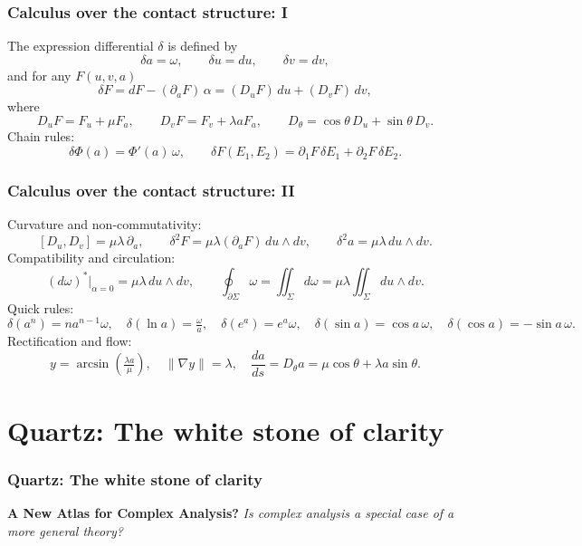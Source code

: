 \documentclass[aspectratio=169]{beamer}
\begin{document}
\begin{frame}
    \frametitle{Calculus over the contact structure: I}
    The expression differential $\delta$ is defined by
    \[
      \delta a=\omega,\qquad \delta u=du,\qquad \delta v=dv,
    \]
    and for any $F(u,v,a)$
    \[
      \delta F = dF - (\partial_a F)\,\alpha
      = (D_uF)\,du + (D_vF)\,dv,
    \]
    where
    \[
      D_uF=F_u+\mu F_a,\qquad D_vF=F_v+\lambda a F_a,\qquad
      D_\theta=\cos\theta\,D_u+\sin\theta\,D_v.
    \]
    Chain rules:
    \[
      \delta\Phi(a)=\Phi'(a)\,\omega,\qquad
      \delta F(E_1,E_2)=\partial_1F\,\delta E_1+\partial_2F\,\delta E_2.
    \]
\end{frame}

\begin{frame}
    \frametitle{Calculus over the contact structure: II}
    Curvature and non-commutativity:
    \[
      [D_u,D_v]=\mu\lambda\,\partial_a,\qquad
      \delta^2F=\mu\lambda(\partial_a F)\,du\wedge dv,\qquad
      \delta^2 a=\mu\lambda\,du\wedge dv.
    \]
    Compatibility and circulation:
    \[
      (d\omega)^*\big|_{\alpha=0}=\mu\lambda\,du\wedge dv,\qquad
      \oint_{\partial\Sigma}\omega=\iint_\Sigma d\omega=\mu\lambda\iint_\Sigma du\wedge dv.
    \]
    Quick rules:
    \[
      \delta(a^n)=n a^{n-1}\omega,\quad
      \delta(\ln a)=\tfrac{\omega}{a},\quad
      \delta(e^a)=e^a\omega,\quad
      \delta(\sin a)=\cos a\,\omega,\quad
      \delta(\cos a)=-\sin a\,\omega.
    \]
    Rectification and flow:
    \[
      y=\arcsin\!\left(\tfrac{\lambda a}{\mu}\right),\quad \|\nabla y\|=\lambda,\quad
      \frac{da}{ds}=D_\theta a=\mu\cos\theta+\lambda a\sin\theta.
    \]
\end{frame}


\section{Quartz: The white stone of clarity}

\begin{frame}
    \frametitle{Quartz: The white stone of clarity}
    \begin{center}
        \Large
        \textbf{A New Atlas for Complex Analysis?}
        \newline\newline
        \emph{Is complex analysis a special case of a more general theory?}
    \end{center}
\end{frame}
\end{document}
